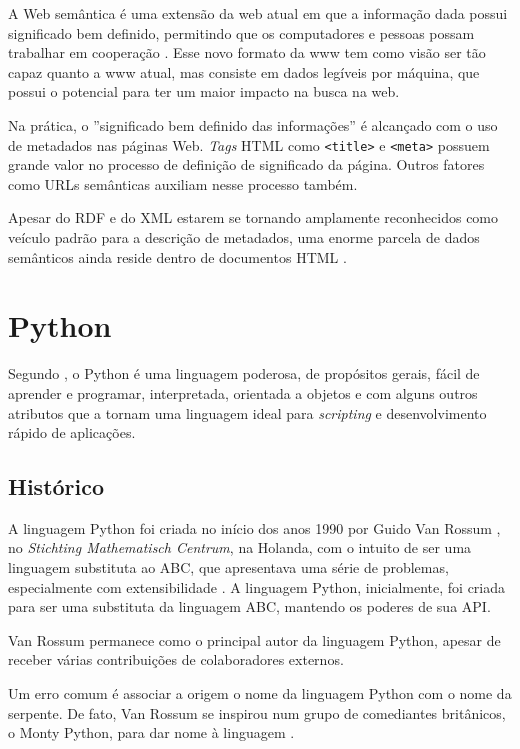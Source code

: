 A Web semântica é uma extensão da web atual em que a informação dada possui significado bem definido, permitindo que os computadores e pessoas possam trabalhar em cooperação \cite[p. 13]{wober}. Esse novo formato da \gls{www} tem como visão ser tão capaz  quanto a \gls{www} atual, mas consiste em dados legíveis por máquina, que possui o potencial para ter um maior impacto na busca na web.


Na prática, o ''significado bem definido das informações'' é alcançado com o uso de metadados nas páginas Web. \emph{Tags} HTML como \texttt{<title>} e \texttt{<meta>} possuem grande valor no processo de definição de significado da página. Outros fatores como URLs semânticas auxiliam nesse processo também.

Apesar do RDF e do XML estarem se tornando amplamente reconhecidos como veículo padrão para a descrição de metadados, uma enorme parcela de dados semânticos ainda reside dentro de documentos HTML \cite[p. 14]{wober}.

\pagebreak
\section{Python}


Segundo \cite{pythondoc}, o Python é uma linguagem poderosa, de propósitos gerais, fácil de aprender e programar, interpretada, orientada a objetos e com alguns outros atributos que a tornam uma linguagem ideal para \emph{scripting} e desenvolvimento rápido de aplicações.

\subsection{Histórico}

A linguagem Python foi criada no início dos anos 1990 por Guido Van Rossum \cite{pythonlicense}, no \emph{Stichting Mathematisch Centrum}, na Holanda, com o intuito de ser uma linguagem substituta ao ABC, que apresentava uma série de problemas, especialmente com extensibilidade \cite{pythonfaq}. A linguagem Python, inicialmente, foi criada para ser uma substituta da linguagem ABC, mantendo os poderes de sua API.

Van Rossum permanece como o principal autor da linguagem Python, apesar de receber várias contribuições de colaboradores externos.

Um erro comum é associar a origem o nome da linguagem Python com o nome da serpente. De fato, Van Rossum se inspirou num grupo de comediantes britânicos, o Monty Python, para dar nome à linguagem \cite{pythonfaq} .

